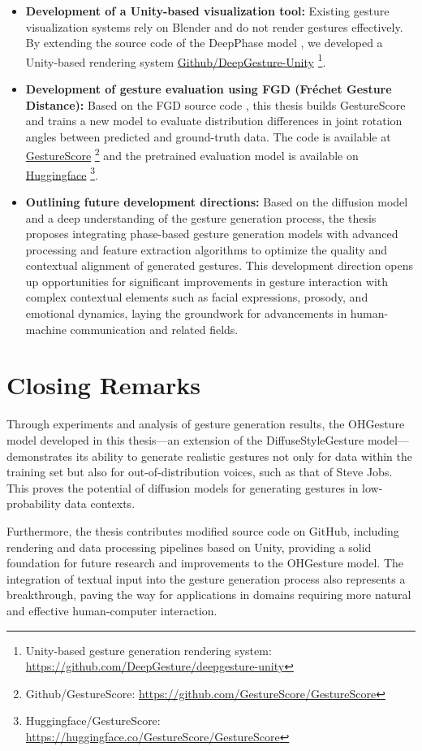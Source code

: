 \begin{itemize}
	\item \textbf{Development of a Unity-based visualization tool:} Existing gesture visualization systems rely on Blender and do not render gestures effectively. By extending the source code of the DeepPhase model \cite{starke2022deepphase}, we developed a Unity-based rendering system \hyperlink{https://github.com/DeepGesture/deepgesture-unity}{Github/DeepGesture-Unity} \footnote{Unity-based gesture generation rendering system: \url{https://github.com/DeepGesture/deepgesture-unity}}.
	
	\item \textbf{Development of gesture evaluation using FGD (Fréchet Gesture Distance):} Based on the FGD source code \cite{yoon2020speech}, this thesis builds GestureScore and trains a new model to evaluate distribution differences in joint rotation angles between predicted and ground-truth data. The code is available at \hyperlink{https://github.com/GestureScore/GestureScore}{GestureScore} \footnote{Github/GestureScore: \url{https://github.com/GestureScore/GestureScore}} and the pretrained evaluation model is available on \hyperlink{https://huggingface.co/GestureScore}{Huggingface} \footnote{Huggingface/GestureScore: \url{https://huggingface.co/GestureScore/GestureScore}}.
	
	\item \textbf{Outlining future development directions:} Based on the diffusion model and a deep understanding of the gesture generation process, the thesis proposes integrating phase-based gesture generation models with advanced processing and feature extraction algorithms to optimize the quality and contextual alignment of generated gestures. This development direction opens up opportunities for significant improvements in gesture interaction with complex contextual elements such as facial expressions, prosody, and emotional dynamics, laying the groundwork for advancements in human-machine communication and related fields.
\end{itemize}

\newpage

\section{Closing Remarks}

Through experiments and analysis of gesture generation results, the OHGesture model developed in this thesis—an extension of the DiffuseStyleGesture model—demonstrates its ability to generate realistic gestures not only for data within the training set but also for out-of-distribution voices, such as that of Steve Jobs. This proves the potential of diffusion models for generating gestures in low-probability data contexts.

Furthermore, the thesis contributes modified source code on GitHub, including rendering and data processing pipelines based on Unity, providing a solid foundation for future research and improvements to the OHGesture model. The integration of textual input into the gesture generation process also represents a breakthrough, paving the way for applications in domains requiring more natural and effective human-computer interaction.
